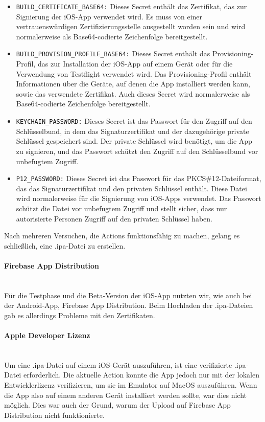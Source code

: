 \begin{itemize}
  \item \verb|BUILD_CERTIFICATE_BASE64:| Dieses Secret enthält das Zertifikat, das zur Signierung der iOS-App verwendet wird. Es muss von einer vertrauenswürdigen Zertifizierungsstelle ausgestellt worden sein und wird normalerweise als Base64-codierte Zeichenfolge bereitgestellt.
  \item \verb|BUILD_PROVISION_PROFILE_BASE64:| Dieses Secret enthält das Provisioning-Profil, das zur Installation der iOS-App auf einem Gerät oder für die Verwendung von Testflight verwendet wird. Das Provisioning-Profil enthält Informationen über die Geräte, auf denen die App installiert werden kann, sowie das verwendete Zertifikat. Auch dieses Secret wird normalerweise als Base64-codierte Zeichenfolge bereitgestellt.
  \item \verb|KEYCHAIN_PASSWORD:| Dieses Secret ist das Passwort für den Zugriff auf den Schlüsselbund, in dem das Signaturzertifikat und der dazugehörige private Schlüssel gespeichert sind. Der private Schlüssel wird benötigt, um die App zu signieren, und das Passwort schützt den Zugriff auf den Schlüsselbund vor unbefugtem Zugriff.
  \item \verb|P12_PASSWORD:| Dieses Secret ist das Passwort für das PKCS\#12-Dateiformat, das das Signaturzertifikat und den privaten Schlüssel enthält. Diese Datei wird normalerweise für die Signierung von iOS-Apps verwendet. Das Passwort schützt die Datei vor unbefugtem Zugriff und stellt sicher, dass nur autorisierte Personen Zugriff auf den privaten Schlüssel haben.
\end{itemize}

Nach mehreren Versuchen, die Actions funktionsfähig zu
machen, gelang es schließlich, eine .ipa-Datei zu erstellen.

\paragraph{Firebase App Distribution}\mbox{} \\
Für die Testphase und die Beta-Version der iOS-App nutzten
wir, wie auch bei der Android-App, Firebase App
Distribution. Beim Hochladen der .ipa-Dateien gab es
allerdings Probleme mit den Zertifikaten.

\paragraph{Apple Developer Lizenz}\mbox{} \\
Um eine .ipa-Datei auf einem iOS-Gerät auszuführen, ist eine verifizierte .ipa-Datei erforderlich. Die aktuelle Action konnte die App jedoch nur mit der lokalen Entwicklerlizenz verifizieren, um sie im Emulator auf MacOS auszuführen. Wenn die App also auf einem anderen Gerät installiert werden sollte, war dies nicht möglich. Dies war auch der Grund, warum der Upload auf Firebase App Distribution nicht funktionierte.

